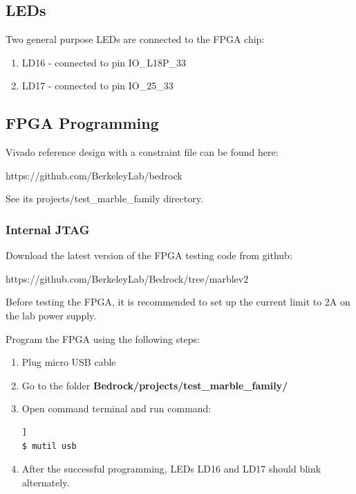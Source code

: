 \documentclass[12pt,oneside,a4]{article}
\begin{document}
\subsection{LEDs}
Two general purpose LEDs are connected to the FPGA chip:
\begin{enumerate}
	\item LD16 - connected to pin IO\_L18P\_33
	\item LD17 - connected to pin IO\_25\_33
\end{enumerate}

\subsection{FPGA Programming}
Vivado reference design with a constraint file can be found here:
\begin{leftbar}
https://github.com/BerkeleyLab/bedrock
\end{leftbar}
See its projects/test\_marble\_family directory.

\subsubsection{Internal JTAG}
Download the latest version of the FPGA testing code from github:
\begin{leftbar}
https://github.com/BerkeleyLab/Bedrock/tree/marblev2
\end{leftbar}

\begin{leftbar}
Before testing the FPGA, it is recommended to set up the current limit to 2A on the lab power supply.
\end{leftbar}

Program the FPGA using the following steps:
\begin{enumerate}
	\item Plug micro USB cable
	\item Go to the folder \textbf{Bedrock/projects/test\_marble\_family/}
	\item Open command terminal and run command:
	\begin{lstlisting}[backgroundcolor = \color{Gainsboro}, language=bash, frame=none]]
$ mutil usb
	\end{lstlisting}
	\item After the successful programming, LEDs LD16 and LD17 should blink alternately.
\end{enumerate}
\end{document}
